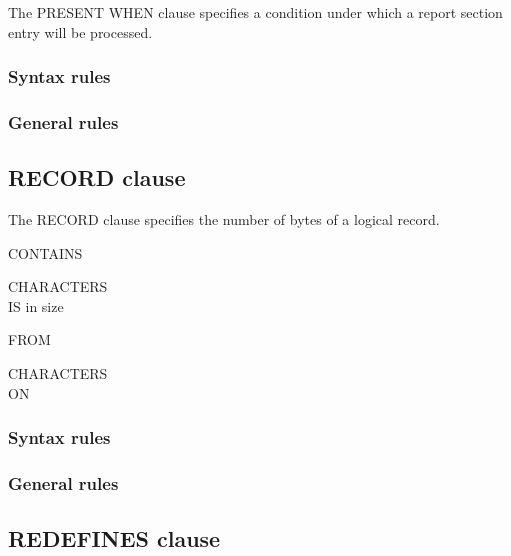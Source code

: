 The PRESENT WHEN clause specifies a condition under which a report section entry will be processed.

\begin{syntax}
    \condition
\end{syntax}

\subsubsection{Syntax rules}

\subsubsection{General rules}

\subsection{RECORD clause}

The RECORD clause specifies the number of bytes of a logical record.

\begin{syntax}
  \begin{1=}
    CONTAINS \integer
    \begin{0-1}
       \integer
    \end{0-1}
    CHARACTERS \\
    IS  in size
    \begin{0-1}
      FROM \integer
    \end{0-1}
    \begin{0-1}
       \integer
    \end{0-1}
    CHARACTERS \\\qquad
     ON \identifier
  \end{1=}
\end{syntax}

\subsubsection{Syntax rules}

\subsubsection{General rules}

\subsection{REDEFINES clause}

